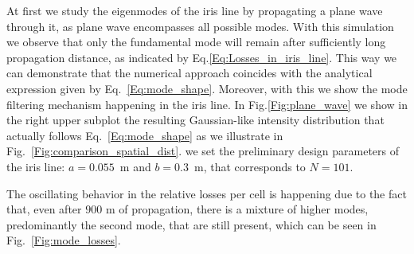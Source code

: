     At first we study the eigenmodes of the iris line by propagating a plane wave through it, as plane wave encompasses all possible modes. With this simulation we observe that only the fundamental mode will remain after sufficiently long propagation distance, as indicated by Eq.\ref{Eq:Losses_in_iris_line}. This way we can demonstrate that the numerical approach coincides with the analytical expression given by Eq.~\ref{Eq:mode_shape}. Moreover, with this we show the mode filtering mechanism happening in the iris line. In Fig.\ref{Fig:plane_wave} we show in the right upper subplot the resulting Gaussian-like intensity distribution that actually follows Eq.~\ref{Eq:mode_shape} as we illustrate in Fig.~\ref{Fig:comparison_spatial_dist}. we set the preliminary design parameters of the iris line: $a = 0.055$~m and $b = 0.3$~m, that corresponds to $N = 101$.
    
    The oscillating behavior in the relative losses per cell is happening due to the fact that, even after $900$ m of propagation, there is a mixture of higher modes, predominantly the second mode, that are still present, which can be seen in Fig.~\ref{Fig:mode_losses}.

